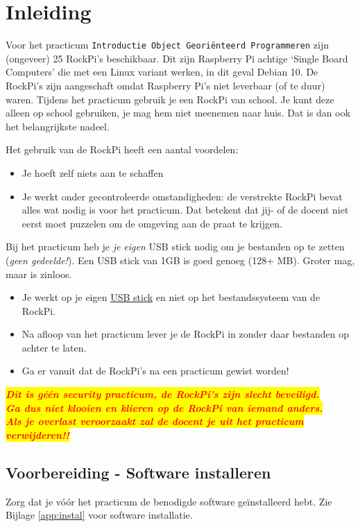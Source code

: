 \chapter{Inleiding}\label{chap:inl}
Voor het practicum \texttt{Introductie Object Georiënteerd Programmeren} zijn (ongeveer) 25 RockPi’s beschikbaar. Dit zijn Raspberry Pi achtige ‘Single Board Computers’ die met een Linux variant werken, in dit geval Debian 10. De RockPi’s zijn aangeschaft omdat Raspberry Pi’s niet leverbaar (of te duur) waren.
Tijdens het practicum gebruik je een RockPi van school. Je kunt deze alleen op school gebruiken, je mag hem niet meenemen naar huis. Dat is dan ook het belangrijkste nadeel.

Het gebruik van de RockPi heeft een aantal voordelen:
\begin{itemize}
\item Je hoeft zelf niets aan te schaffen
\item Je werkt onder gecontroleerde omstandigheden: de verstrekte RockPi bevat alles wat nodig is voor het practicum. Dat betekent dat jij- of de docent niet eerst moet puzzelen om de omgeving aan de praat te krijgen.
\end{itemize}

\hypertarget{USBinleiding}{}
Bij het practicum heb je \textit{je eigen} USB stick nodig om je bestanden op te zetten (\textit{geen gedeelde!}). Een USB stick van 1GB is goed genoeg (128+ MB). Groter mag, maar is zinloos.
\begin{itemize}
\item Je werkt op je eigen \hyperlink{chp:USBstick}{USB stick} en niet op het bestandssysteem van de RockPi. 
\item Na afloop van het practicum lever je de RockPi in zonder daar bestanden op achter te laten. 
\item Ga er vanuit dat de RockPi’s na een practicum gewist worden!
\end{itemize}
\colorbox{yellow}{\textcolor{red}{\textbf{\textit{Dit is géén security practicum, de RockPi's zijn slecht beveiligd.}}}}\\
\colorbox{yellow}{\textcolor{red}{\textbf{\textit{Ga dus niet klooien en klieren op de RockPi van iemand anders.}}}}\\
\colorbox{yellow}{\textcolor{red}{\textbf{\textit{Als je overlast veroorzaakt zal de docent je uit het practicum verwijderen!!}}}}

\section{Voorbereiding - Software installeren}
Zorg dat je vóór het practicum de benodigde software geïnstalleerd hebt.
Zie Bijlage \ref{app:instal} voor software installatie.
\newpage

